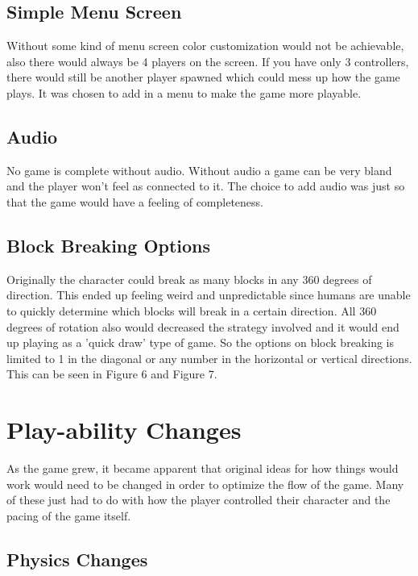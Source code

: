 \documentclass[conference,compsoc]{IEEEtran}
\begin{document}
\subsection{Simple Menu Screen}

Without some kind of menu screen color customization would not be achievable, also there would always be 4 players on the screen. If you have only 3 controllers, there would still be another player spawned which could mess up how the game plays. It was chosen to add in a menu to make the game more playable.

\subsection{Audio}

No game is complete without audio. Without audio a game can be very bland and the player won't feel as connected to it. The choice to add audio was just so that the game would have a feeling of completeness.

\subsection{Block Breaking Options}

Originally the character could break as many blocks in any 360 degrees of direction. This ended up feeling weird and unpredictable since humans are unable to quickly determine which blocks will break in a certain direction. All 360 degrees of rotation also would decreased the strategy involved and it would end up playing as a 'quick draw' type of game. So the options on block breaking is limited to 1 in the diagonal or any number in the horizontal or vertical directions. This can be seen in Figure 6 and Figure 7.

\section{Play-ability Changes}

As the game grew, it became apparent that original ideas for how things would work would need to be changed in order to optimize the flow of the game. Many of these just had to do with how the player controlled their character and the pacing of the game itself.

\subsection{Physics Changes}
\end{document}
